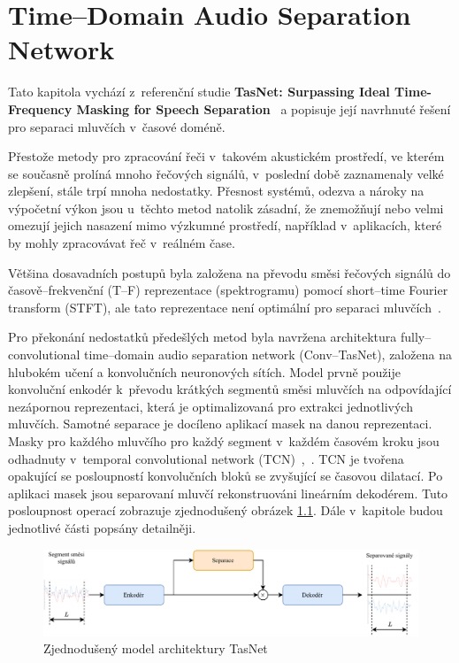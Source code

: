 \chapter{Time--Domain Audio Separation Network}
\label{tasnet}

Tato kapitola vychází z~referenční studie \textbf{TasNet: Surpassing Ideal Time-Frequency Masking for Speech Separation}~\cite{luo2018convtasnet} a popisuje její navrhnuté řešení pro separaci mluvčích v~časové doméně.

Přestože metody pro zpracování řeči v~takovém akustickém prostředí, ve kterém se současně prolíná mnoho řečových signálů, v~poslední době zaznamenaly velké zlepšení, stále trpí mnoha nedostatky. Přesnost systémů, odezva a nároky na výpočetní výkon jsou u~těchto metod natolik zásadní, že znemožňují nebo velmi omezují jejich nasazení mimo výzkumné prostředí, například v~aplikacích, které by mohly zpracovávat řeč v~reálném čase.

Většina dosavadních postupů byla založena na převodu směsi řečových signálů do časově--frekvenční (T--F) reprezentace (spektrogramu) pomocí short--time Fourier transform (STFT), ale tato reprezentace není optimální pro separaci mluvčích~\cite{speechseparationoverview}.

Pro překonání nedostatků předešlých metod byla navržena architektura fully--convolutional time--domain audio separation network (Conv--TasNet), založena na hlubokém učení a konvolučních neuronových sítích. Model prvně použije konvoluční enkodér k~převodu krátkých segmentů směsi mluvčích na odpovídající nezápornou reprezentaci, která je optimalizovaná pro extrakci jednotlivých mluvčích. Samotné separace je docíleno aplikací masek na danou reprezentaci. Masky pro každého mluvčího pro každý segment v~každém časovém kroku jsou odhadnuty v~temporal convolutional network (TCN)~\cite{lea2016temporal},~\cite{bai2018empirical}. TCN je tvořena opakující se posloupností konvolučních bloků se zvyšující se časovou dilatací. Po aplikaci masek jsou separovaní mluvčí rekonstruováni lineárním dekodérem. Tuto posloupnost operací zobrazuje zjednodušený obrázek \ref{fig:tasnet-pipe}. Dále v~kapitole budou jednotlivé části popsány detailněji.

\begin{figure}[H]
    \centering
    \includegraphics[scale=0.8]{obrazky-figures/tasnet-pipe.pdf}
    \caption{\label{fig:tasnet-pipe}Zjednodušený model architektury TasNet}
\end{figure}



